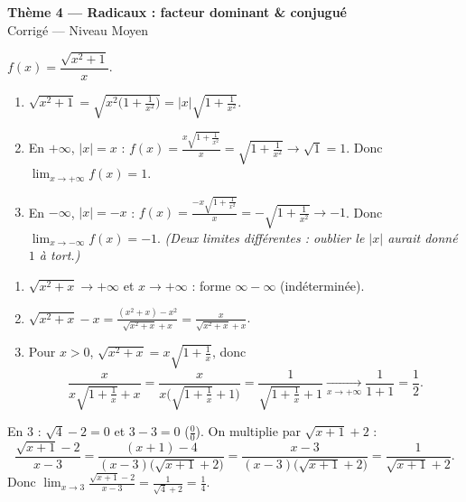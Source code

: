 \documentclass[11pt,a4paper]{article}
\begin{document}
\begin{center}
{\Large\bfseries\color{primarydark}Thème 4 — Radicaux : facteur dominant \& conjugué}\\[2pt]
{\large\color{excol}Corrigé — Niveau Moyen}
\end{center}
\vspace{6pt}

\begin{correction}
$f(x)=\dfrac{\sqrt{x^2+1}}{x}$.
\begin{enumerate}[label=\alph*),leftmargin=2em,itemsep=3pt]
  \item $\sqrt{x^2+1}=\sqrt{x^2\bigl(1+\tfrac{1}{x^2}\bigr)}=|x|\sqrt{1+\tfrac{1}{x^2}}$.
  \item En $+\infty$, $|x|=x$ : $\displaystyle f(x)=\frac{x\sqrt{1+\frac{1}{x^2}}}{x}=\sqrt{1+\tfrac{1}{x^2}}\to\sqrt1=1$.
        Donc $\displaystyle\lim_{x\to+\infty} f(x)=1$.
  \item En $-\infty$, $|x|=-x$ : $\displaystyle f(x)=\frac{-x\sqrt{1+\frac{1}{x^2}}}{x}=-\sqrt{1+\tfrac{1}{x^2}}\to-1$.
        Donc $\displaystyle\lim_{x\to-\infty} f(x)=-1$. \emph{(Deux limites différentes : oublier le $|x|$ aurait donné $1$ à tort.)}
\end{enumerate}
\end{correction}

\begin{correction}
\begin{enumerate}[label=\alph*),leftmargin=2em,itemsep=3pt]
  \item $\sqrt{x^2+x}\to+\infty$ et $x\to+\infty$ : forme $\infty-\infty$ (indéterminée).
  \item $\displaystyle\sqrt{x^2+x}-x=\frac{(x^2+x)-x^2}{\sqrt{x^2+x}+x}=\frac{x}{\sqrt{x^2+x}+x}$.
  \item Pour $x>0$, $\sqrt{x^2+x}=x\sqrt{1+\tfrac1x}$, donc
        \[ \frac{x}{x\sqrt{1+\frac1x}+x}=\frac{x}{x\bigl(\sqrt{1+\frac1x}+1\bigr)}=\frac{1}{\sqrt{1+\frac1x}+1}
        \xrightarrow[x\to+\infty]{}\frac{1}{1+1}=\frac12. \]
\end{enumerate}
\end{correction}

\begin{correction}
En $3$ : $\sqrt{4}-2=0$ et $3-3=0$ ($\frac00$). On multiplie par $\sqrt{x+1}+2$ :
\[ \frac{\sqrt{x+1}-2}{x-3}=\frac{(x+1)-4}{(x-3)\bigl(\sqrt{x+1}+2\bigr)}
  =\frac{x-3}{(x-3)\bigl(\sqrt{x+1}+2\bigr)}=\frac{1}{\sqrt{x+1}+2}. \]
Donc $\displaystyle\lim_{x\to 3}\frac{\sqrt{x+1}-2}{x-3}=\frac{1}{\sqrt{4}+2}=\frac{1}{4}$.
\end{correction}
\end{document}
